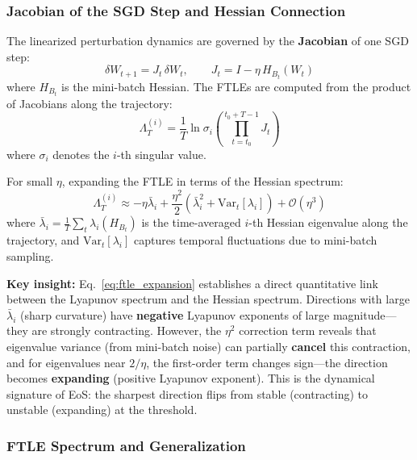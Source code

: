 \documentclass[
  journal=largetwo,
  year=2025,
  volume=37,
]{cup-journal}
\begin{document}
\subsubsection{Jacobian of the SGD Step and Hessian Connection}

The linearized perturbation dynamics are governed by the \textbf{Jacobian} of one SGD step:
\begin{equation}
    \delta W_{t+1} = J_t \, \delta W_t, \qquad J_t = I - \eta\, H_{B_t}(W_t)
\end{equation}
where $H_{B_t}$ is the mini-batch Hessian. The FTLEs are computed from the product of Jacobians along the trajectory:
\begin{equation}
    \Lambda_T^{(i)} = \frac{1}{T} \ln \sigma_i\!\left(\prod_{t=t_0}^{t_0+T-1} J_t\right)
\end{equation}
where $\sigma_i$ denotes the $i$-th singular value.

For small $\eta$, expanding the FTLE in terms of the Hessian spectrum:
\begin{equation}\label{eq:ftle_expansion}
    \Lambda_T^{(i)} \approx -\eta \bar{\lambda}_i + \frac{\eta^2}{2}\left(\bar{\lambda}_i^2 + \mathrm{Var}_t[\lambda_i]\right) + \mathcal{O}(\eta^3)
\end{equation}
where $\bar{\lambda}_i = \frac{1}{T}\sum_t \lambda_i(H_{B_t})$ is the time-averaged $i$-th Hessian eigenvalue along the trajectory, and $\mathrm{Var}_t[\lambda_i]$ captures temporal fluctuations due to mini-batch sampling.

\textbf{Key insight:} Eq.~\eqref{eq:ftle_expansion} establishes a direct quantitative link between the Lyapunov spectrum and the Hessian spectrum. Directions with large $\bar{\lambda}_i$ (sharp curvature) have \textbf{negative} Lyapunov exponents of large magnitude---they are strongly contracting. However, the $\eta^2$ correction term reveals that eigenvalue variance (from mini-batch noise) can partially \textbf{cancel} this contraction, and for eigenvalues near $2/\eta$, the first-order term changes sign---the direction becomes \textbf{expanding} (positive Lyapunov exponent). This is the dynamical signature of EoS: the sharpest direction flips from stable (contracting) to unstable (expanding) at the threshold.

\subsubsection{FTLE Spectrum and Generalization}
\end{document}
